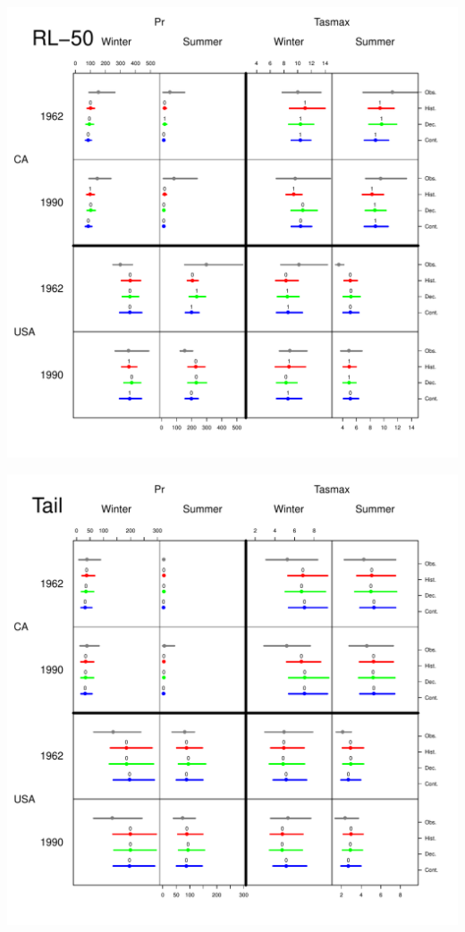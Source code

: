\documentclass[mathserif, 11pt, t]{beamer}
\begin{document}
\begin{frame}
\begin{center}
\includegraphics[scale=0.34]{figs/rl50.pdf}
\end{center}
\end{frame}

\begin{frame}
\begin{center}
\includegraphics[scale=0.34]{figs/gp_tail.pdf}
\end{center}
\end{frame}
\end{document}
